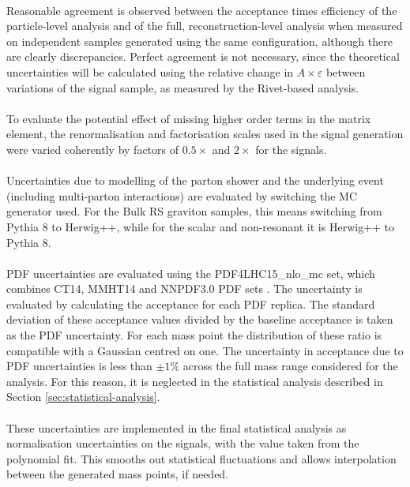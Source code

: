\paragraph{}
Reasonable agreement is observed between the acceptance times efficiency of the particle-level analysis and of the full, reconstruction-level analysis when measured on independent samples generated using the same configuration, although there are clearly discrepancies. Perfect agreement is not necessary, since the theoretical uncertainties will be calculated using the relative change in $A\times\varepsilon$ between variations of the signal sample, as measured by the Rivet-based analysis.

\paragraph{}
To evaluate the potential effect of missing higher order terms in the matrix element, the renormalisation and factorisation scales used in the signal generation were varied coherently by factors of $0.5\times$ and $2\times$ for the signals. 

\paragraph{}
Uncertainties due to modelling of the parton shower and the underlying event (including multi-parton interactions) are evaluated by switching the MC generator used. For the Bulk RS graviton samples, this means switching from Pythia 8 to Herwig++, while for the scalar and non-resonant it is Herwig++ to Pythia 8.

\paragraph{}
PDF uncertainties are evaluated using the PDF4LHC15\_nlo\_mc set, which combines CT14, MMHT14 and NNPDF3.0 PDF sets \cite{0954-3899-43-2-023001}. The uncertainty is evaluated by calculating the acceptance for each PDF replica. The standard deviation of these acceptance values divided by the baseline acceptance is taken as the PDF uncertainty. For each mass point the distribution of these ratio is compatible with a Gaussian centred on one. 
The uncertainty in acceptance due to PDF uncertainties is less than $\pm1\%$ across the full mass range considered for the analysis. For this reason, it is neglected in the statistical analysis described in Section \ref{sec:statistical-analysis}.

\paragraph{}
These uncertainties are implemented in the final statistical analysis as normalisation uncertainties on the signals, with the value taken from the polynomial fit. 
This smooths out statistical fluctuations and allows interpolation between the generated mass points, if needed.


